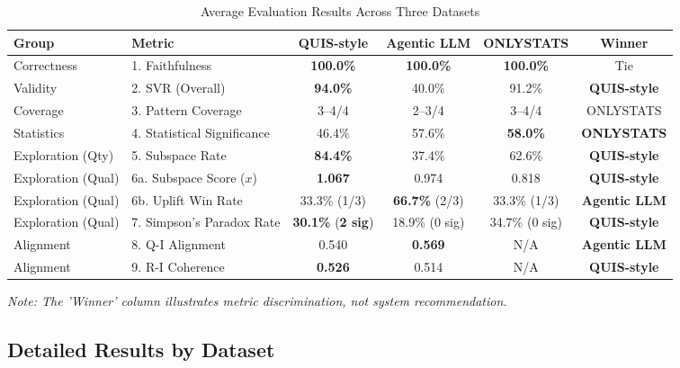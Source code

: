 \documentclass[conference]{IEEEtran}
\begin{document}
{
\renewcommand{\arraystretch}{0.88}
\setlength{\abovecaptionskip}{0pt}
\setlength{\belowcaptionskip}{-4pt}
\begin{table}[htbp]
\caption{Average Evaluation Results Across Three Datasets}
\centering
\begin{tabular}{|l|l|c|c|c|c|}
\hline
\textbf{Group} & \textbf{Metric} & \textbf{QUIS-style} & \textbf{Agentic LLM} & \textbf{ONLYSTATS} & \textbf{Winner} \\
\hline
Correctness & 1. Faithfulness & \textbf{100.0\%} & \textbf{100.0\%} & \textbf{100.0\%} & Tie \\
Validity & 2. SVR (Overall) & \textbf{94.0\%} & 40.0\% & 91.2\% & \textbf{QUIS-style} \\
Coverage & 3. Pattern Coverage & 3--4/4 & 2--3/4 & 3--4/4 & ONLYSTATS \\
Statistics & 4. Statistical Significance & 46.4\% & 57.6\% & \textbf{58.0\%} & \textbf{ONLYSTATS} \\
Exploration (Qty) & 5. Subspace Rate & \textbf{84.4\%} & 37.4\% & 62.6\% & \textbf{QUIS-style} \\
Exploration (Qual) & 6a. Subspace Score ($x$) & \textbf{1.067} & 0.974 & 0.818 & \textbf{QUIS-style} \\
Exploration (Qual) & 6b. Uplift Win Rate & 33.3\% (1/3) & \textbf{66.7\%} (2/3) & 33.3\% (1/3) & \textbf{Agentic LLM} \\
Exploration (Qual) & 7. Simpson's Paradox Rate & \textbf{30.1\%} (\textbf{2 sig}) & 18.9\% (0 sig) & 34.7\% (0 sig) & \textbf{QUIS-style} \\
Alignment & 8. Q-I Alignment & 0.540 & \textbf{0.569} & N/A & \textbf{Agentic LLM} \\
Alignment & 9. R-I Coherence & \textbf{0.526} & 0.514 & N/A & \textbf{QUIS-style} \\
\hline
\end{tabular}
\label{tab:avg_results}
\vspace{2pt}

{\scriptsize\textit{Note: The 'Winner' column illustrates metric discrimination, not system recommendation.}}
\vspace{-6pt}
\end{table}
}

\subsection{Detailed Results by Dataset}
\end{document}
